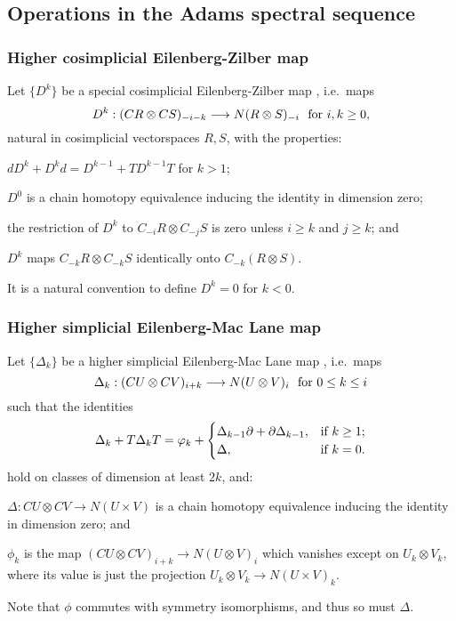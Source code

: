 \documentclass[10pt]{article}
\begin{document}
\begin{AdamsSSEQ operations final}

\section{Operations in the Adams spectral sequence}
\subsubsection*{Higher cosimplicial Eilenberg-Zilber map}
Let $\{D^k\}$ be a special cosimplicial Eilenberg-Zilber map \cite[5.2]{turner_opns_and_sseqs_I.pdf}, i.e.\  maps
\[D^k:(CR\otimes CS)_{-i-k}\to N(R\otimes S)_{-i}\textup{\ \ for $i,k\geq0$},\]
natural in cosimplicial vectorspaces $R,S$,
with the properties:
\begin{itemise}
\setlength{\parindent}{.25in}
\item $dD^k+D^kd=D^{k-1}+TD^{k-1}T$ for $k>1$;
\item $D^0$ is a chain homotopy equivalence inducing the identity in dimension zero;
\item the restriction of $D^k$ to $C_{-i}R\otimes C_{-j}S$ is zero unless $i\geq k$ and $j\geq k$; and
\item $D^k$ maps $C_{-k}R\otimes C_{-k}S$ identically onto $C_{-k}(R\otimes S)$.
\end{itemise}
It is a natural convention to define $D^k=0$ for $k<0$.
\subsubsection*{Higher simplicial Eilenberg-Mac Lane map}
Let $\{\Delta_k\}$ be a higher simplicial Eilenberg-Mac Lane map \cite[\S3]{DwyerHtpyOpsSimpComAlg.pdf}, i.e.\ maps
\[\Delta_k:(CU\otimes CV)_{i+k}\to N(U\otimes V)_i\textup{\ \ for $0\leq k\leq i$}\]
such that the identities
\[\Delta_k+T\Delta_kT=\phi_k+\begin{cases}
\Delta_{k-1}\partial+\partial\Delta_{k-1},&\textup{if }k\geq1;\\
\Delta,&\textup{if }k=0.
\end{cases}
\]
hold on classes of dimension at least $2k$, and:
\begin{itemise}
\setlength{\parindent}{.25in}
\item $\Delta:CU\otimes CV\to N(U\times V)$ is a chain homotopy equivalence inducing the identity in dimension zero; and
\item $\phi_k$ is the map $(CU\otimes CV)_{i+k}\to N(U\otimes V)_i$ which vanishes except on $U_k\otimes V_k$, where its value is just the projection $U_k\otimes V_k\to N(U\times V)_k$.
\end{itemise}
Note that $\phi$ commutes with symmetry isomorphisms, and thus so must $\Delta$.


\end{AdamsSSEQ operations final}
\end{document}
